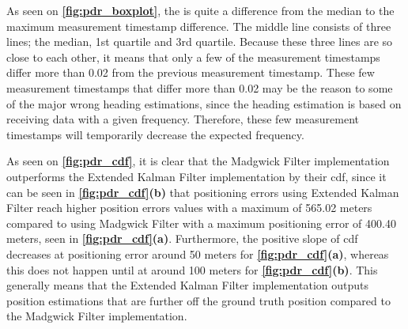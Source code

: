 As seen on \textbf{\autoref{fig:pdr_boxplot}}, the is quite a difference from the median to the maximum measurement timestamp difference. The middle line consists of three lines; the median, 1st quartile and 3rd quartile. Because these three lines are so close to each other, it means that only a few of the measurement timestamps differ more than 0.02 from the previous measurement timestamp. These few measurement timestamps that differ more than 0.02 may be the reason to some of the major wrong heading estimations, since the heading estimation is based on receiving data with a given frequency. Therefore, these few measurement timestamps will temporarily decrease the expected frequency.

As seen on \textbf{\autoref{fig:pdr_cdf}}, it is clear that the Madgwick Filter implementation outperforms the Extended Kalman Filter implementation by their \gls{cdf}, since it can be seen in \textbf{\autoref{fig:pdr_cdf}(b)} that positioning errors using Extended Kalman Filter reach higher position errors values with a maximum of 565.02 meters compared to using Madgwick Filter with a maximum positioning error of 400.40 meters, seen in \textbf{\autoref{fig:pdr_cdf}(a)}. Furthermore, the positive slope of \gls{cdf} decreases at positioning error around 50 meters for \textbf{\autoref{fig:pdr_cdf}(a)}, whereas this does not happen until at around 100 meters for \textbf{\autoref{fig:pdr_cdf}(b)}. This generally means that the Extended Kalman Filter implementation outputs position estimations that are further off the ground truth position compared to the Madgwick Filter implementation.


